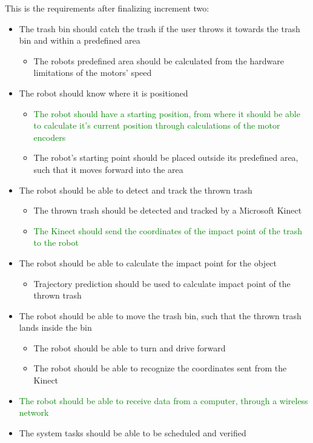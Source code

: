 This is the requirements after finalizing increment two: 
\begin{itemize}
	\item The trash bin should catch the trash if the user throws it towards the trash bin and within a predefined area
	\begin{itemize}
		\item {The robots predefined area should be calculated from the hardware limitations of the motors’ speed}
	\end{itemize}
	\item The robot should know where it is positioned
	\begin{itemize}
		\item \textcolor{green}{The robot should have a starting position, from where it should be able to calculate it's current position through calculations of the motor encoders}
		\item {The robot's starting point should be placed outside its predefined area, such that it moves forward into the area}
	\end{itemize}
	\item The robot should be able to detect and track the thrown trash
	\begin{itemize}
		\item {The thrown trash should be detected and tracked by a Microsoft Kinect}
		\item \textcolor{green}{The Kinect should send the coordinates of the impact point of the trash to the robot}
	\end{itemize}
	\item The robot should be able to calculate the impact point for the object
	\begin{itemize}
		\item {Trajectory prediction should be used to calculate impact point of the thrown trash}
	\end{itemize}
	\item The robot should be able to move the trash bin, such that the thrown trash lands inside the bin
	\begin{itemize}
		\item {The robot should be able to turn and drive forward}
		\item {The robot should be able to recognize the coordinates sent from the Kinect}
	\end{itemize}
	\item \textcolor{green}{The robot should be able to receive data from a computer, through a wireless network}
	\item {The system tasks should be able to be scheduled and verified}
\end{itemize}
